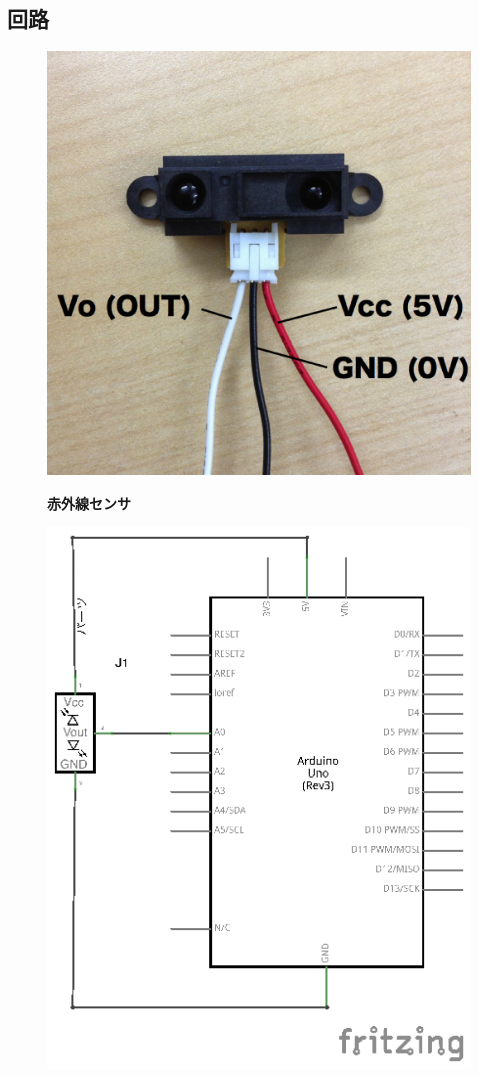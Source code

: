 \documentclass[11pt,a4paper]{jarticle}
\begin{document}
\subsection*{回路}
\begin{figure}[h!]
 \begin{minipage}{0.5\columnwidth}
  \centering
  \includegraphics[width=0.7\columnwidth]{img/ir_sensor.eps}
  \begin{center}
   \textbf{赤外線センサ}
  \end{center}
 \end{minipage}
 \begin{minipage}{0.5\columnwidth}
  \centering
  \includegraphics[width=\columnwidth]{img/ir_sensor_circuit.eps}

\end{minipage}
\end{figure}
\end{document}

